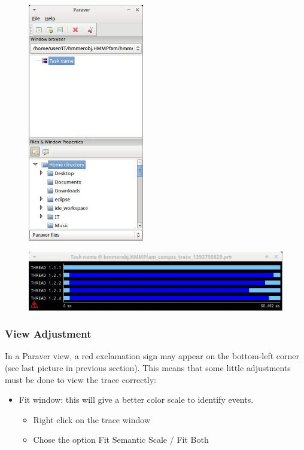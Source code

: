 \begin{figure}[ht!]
  \centering
    \includegraphics[width=0.45\textwidth]{./Sections/7_Tracing/Figures/1.jpeg}
\end{figure}

\begin{figure}[ht!]
  \centering
    \includegraphics[width=1.0\textwidth]{./Sections/7_Tracing/Figures/2.jpeg}
\end{figure}

\subsubsection{View Adjustment}
In a Paraver view, a red exclamation sign may appear on the bottom-left corner (see last picture in 
previous section). This means that some little adjustments must be done to view the trace correctly:

\begin{itemize}
 \item Fit window: this will give a better color scale to identify events.
 \begin{itemize}
  \item Right click on the trace window
  \item Chose the option Fit Semantic Scale / Fit Both
 \end{itemize}
\end{itemize}

